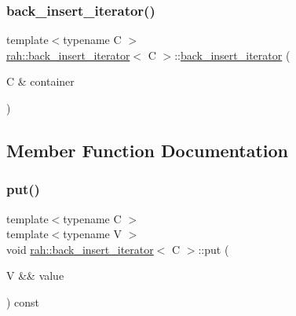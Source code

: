 \subsubsection{\texorpdfstring{back\_insert\_iterator()}{back\_insert\_iterator()}\hspace{0.1cm}{\footnotesize\ttfamily [2/2]}}
{\footnotesize\ttfamily template$<$typename C $>$ \\
\mbox{\hyperlink{structrah_1_1back__insert__iterator}{rah\+::back\+\_\+insert\+\_\+iterator}}$<$ C $>$\+::\mbox{\hyperlink{structrah_1_1back__insert__iterator}{back\+\_\+insert\+\_\+iterator}} (\begin{DoxyParamCaption}\item[{C \&}]{container }\end{DoxyParamCaption})\hspace{0.3cm}{\ttfamily [inline]}}



\subsection{Member Function Documentation}
\mbox{\label{structrah_1_1back__insert__iterator_a5af149b87aebf5ced8a4143afe79ad50}} 
\subsubsection{\texorpdfstring{put()}{put()}\hspace{0.1cm}{\footnotesize\ttfamily [1/2]}}
{\footnotesize\ttfamily template$<$typename C $>$ \\
template$<$typename V $>$ \\
void \mbox{\hyperlink{structrah_1_1back__insert__iterator}{rah\+::back\+\_\+insert\+\_\+iterator}}$<$ C $>$\+::put (\begin{DoxyParamCaption}\item[{V \&\&}]{value }\end{DoxyParamCaption}) const\hspace{0.3cm}{\ttfamily [inline]}}

\mbox{\label{structrah_1_1back__insert__iterator_a5af149b87aebf5ced8a4143afe79ad50}} 
